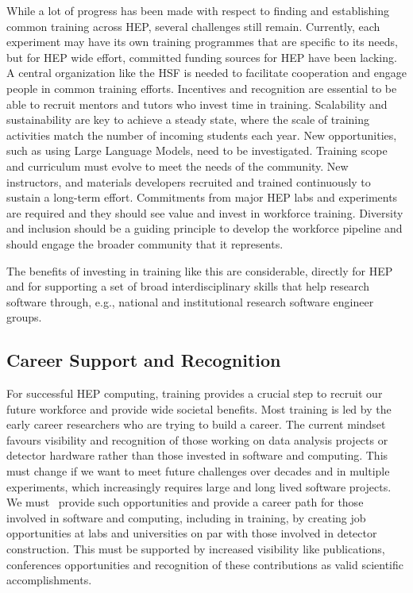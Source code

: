 \documentclass[10pt,a4paper]{article}
\begin{document}
While a lot of progress has been made with respect to finding and establishing
common training across HEP, several challenges still remain. Currently, each
experiment may have its own training programmes that are specific to its
needs, but for HEP wide effort, committed funding sources for HEP have been
lacking. A central organization like the HSF is needed to facilitate cooperation
and engage people in common training efforts. Incentives and recognition are
essential to be able to recruit mentors and tutors who invest time in training.
Scalability and sustainability are key to achieve a steady state, where the
scale of training activities match the number of incoming students each year.
New opportunities, such as using Large Language Models, need to be investigated.
Training scope and curriculum must evolve to meet the needs of the community.
New instructors, and materials developers recruited and trained continuously to
sustain a long-term effort. Commitments from major HEP labs and experiments are
required and they should see value and invest in workforce training. Diversity
and inclusion should be a guiding principle to develop the workforce pipeline
and should engage the broader community that it represents.

The benefits of investing in training like this are considerable, directly for
HEP and for supporting a set of broad interdisciplinary skills that help
research software through, e.g., national and institutional research software
engineer groups.

\subsection{Career Support and
Recognition}\label{career-support-and-recognition}

For successful HEP computing, training provides a crucial step to recruit our
future workforce and provide wide societal benefits. Most training is led by the
early career researchers who are trying to build a career. The current mindset
favours visibility and recognition of those working on data analysis projects or
detector hardware rather than those invested in software and computing. This
must change if we want to meet future challenges over decades and in multiple
experiments, which increasingly requires large and long lived software projects.
We must~\cite{hsfcwp} provide such opportunities and provide a career path for those
involved in software and computing, including in training, by creating job
opportunities at labs and universities on par with those involved in detector
construction. This must be supported by increased visibility like publications,
conferences opportunities and recognition of these contributions as valid
scientific accomplishments.
\end{document}
